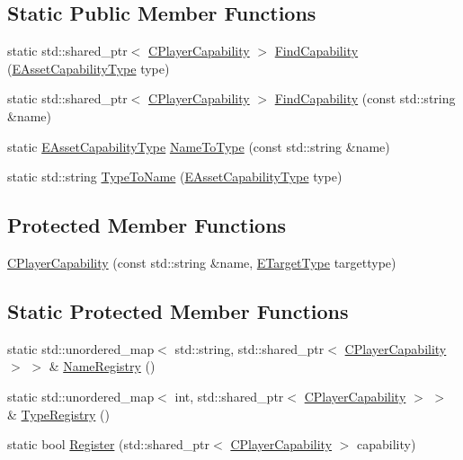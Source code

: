 \subsection*{Static Public Member Functions}
\begin{DoxyCompactItemize}
\item 
static std\+::shared\+\_\+ptr$<$ \hyperlink{classCPlayerCapability}{C\+Player\+Capability} $>$ \hyperlink{classCPlayerCapability_a881ba4b87385d7cfe5cb6ced2d26f226}{Find\+Capability} (\hyperlink{GameDataTypes_8h_a35b98ce26aca678b03c6f9f76e4778ce}{E\+Asset\+Capability\+Type} type)
\item 
static std\+::shared\+\_\+ptr$<$ \hyperlink{classCPlayerCapability}{C\+Player\+Capability} $>$ \hyperlink{classCPlayerCapability_aca2e1bf2f3dfdced2ff12f922aa52a30}{Find\+Capability} (const std\+::string \&name)
\item 
static \hyperlink{GameDataTypes_8h_a35b98ce26aca678b03c6f9f76e4778ce}{E\+Asset\+Capability\+Type} \hyperlink{classCPlayerCapability_a920a696526e8a839f728192aea0ba1c5}{Name\+To\+Type} (const std\+::string \&name)
\item 
static std\+::string \hyperlink{classCPlayerCapability_a976f05b7e620b721bdb5051debc9b93d}{Type\+To\+Name} (\hyperlink{GameDataTypes_8h_a35b98ce26aca678b03c6f9f76e4778ce}{E\+Asset\+Capability\+Type} type)
\end{DoxyCompactItemize}
\subsection*{Protected Member Functions}
\begin{DoxyCompactItemize}
\item 
\hyperlink{classCPlayerCapability_a303de62aba5d3f65d9a8e013c64a96c1}{C\+Player\+Capability} (const std\+::string \&name, \hyperlink{classCPlayerCapability_a9d3450ed1532fd536bd6cbb1e2eef02f}{E\+Target\+Type} targettype)
\end{DoxyCompactItemize}
\subsection*{Static Protected Member Functions}
\begin{DoxyCompactItemize}
\item 
static std\+::unordered\+\_\+map$<$ std\+::string, std\+::shared\+\_\+ptr$<$ \hyperlink{classCPlayerCapability}{C\+Player\+Capability} $>$ $>$ \& \hyperlink{classCPlayerCapability_aa804d42c236f11ec9549057c22699837}{Name\+Registry} ()
\item 
static std\+::unordered\+\_\+map$<$ int, std\+::shared\+\_\+ptr$<$ \hyperlink{classCPlayerCapability}{C\+Player\+Capability} $>$ $>$ \& \hyperlink{classCPlayerCapability_ab7fee932703792663278b1b2128f00f3}{Type\+Registry} ()
\item 
static bool \hyperlink{classCPlayerCapability_a7e298018dcde2684451add3cfff065f7}{Register} (std\+::shared\+\_\+ptr$<$ \hyperlink{classCPlayerCapability}{C\+Player\+Capability} $>$ capability)
\end{DoxyCompactItemize}
